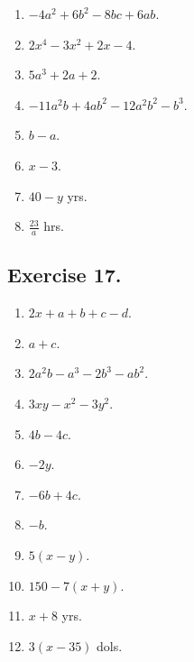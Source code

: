 \documentclass{book}
\begin{document}
\begin{enumerate}
\item $-4a^2 + 6b^2 - 8bc + 6ab$.

\item $2x^4 - 3x^2 + 2x - 4$.

\item $5a^3 + 2a + 2$.

\item $-11a^2b + 4ab^2 - 12a^2b^2 - b^3$.

\item $b - a$.

\item $x - 3$.

\item $40 - y$ yrs.

\item $\frac{23}{a}$ hrs.
\end{enumerate}
\subsection*{Exercise 17.} \begin{enumerate}

\item $2x + a + b + c - d$.

\item $a + c$.

\item $2a^2b-a^3-2b^3-ab^2$.

\item $3xy - x^2 - 3y^2$.

\item $4b - 4c$.

\item $-2y$.

\item $-6b + 4c$.

\item $-b$.

\setcounter{enumi}{16}

\item $5(x - y)$.

\item $150 - 7(x + y)$.

\item $x + 8$ yrs.

\item $3(x - 35)$ dols.
\end{enumerate}
\end{document}
